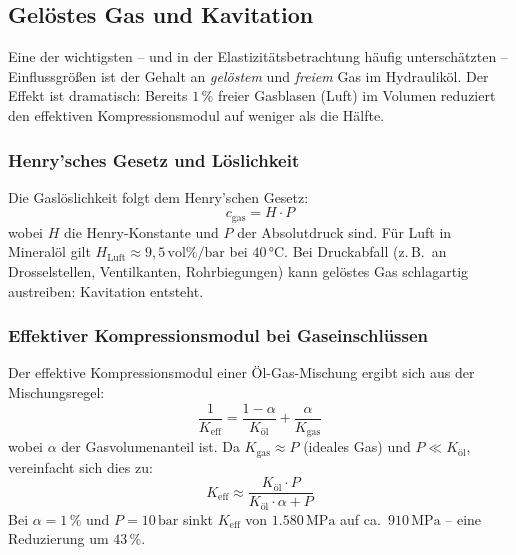 ﻿\documentclass[a4paper,12pt]{scrreprt}
\theoremstyle{definition}
\begin{document}
\subsection{Gelöstes Gas und Kavitation}

Eine der wichtigsten -- und in der Elastizitätsbetrachtung häufig
unterschätzten -- Einflussgrößen ist der Gehalt an \emph{gelöstem} und
\emph{freiem} Gas im Hydrauliköl. Der Effekt ist dramatisch: Bereits
$1\,\%$ freier Gasblasen (Luft) im Volumen reduziert den effektiven
Kompressionsmodul auf weniger als die Hälfte.

\subsubsection{Henry'sches Gesetz und Löslichkeit}

Die Gaslöslichkeit folgt dem Henry'schen Gesetz:
\begin{equation}
  c_{\mathrm{gas}} = H \cdot P
  \label{eq:henry}
\end{equation}
wobei $H$ die Henry-Konstante und $P$ der Absolutdruck sind. Für Luft in
Mineralöl gilt $H_{\mathrm{Luft}} \approx 9{,}5\,\mathrm{vol\%/bar}$ bei
$40\, °\mathrm{C}$. Bei Druckabfall (z.\,B.\ an Drosselstellen, Ventilkanten,
Rohrbiegungen) kann gelöstes Gas schlagartig austreiben: Kavitation entsteht.

\subsubsection{Effektiver Kompressionsmodul bei Gaseinschlüssen}

Der effektive Kompressionsmodul einer Öl-Gas-Mischung ergibt sich aus der
Mischungsregel:
\begin{equation}
  \frac{1}{K_{\mathrm{eff}}} = \frac{1 - \alpha}{K_{\mathrm{öl}}}
    + \frac{\alpha}{K_{\mathrm{gas}}}
  \label{eq:k_effektiv}
\end{equation}
wobei $\alpha$ der Gasvolumenanteil ist. Da $K_{\mathrm{gas}} \approx P$
(ideales Gas) und $P \ll K_{\mathrm{öl}}$, vereinfacht sich dies zu:
\begin{equation}
  K_{\mathrm{eff}} \approx \frac{K_{\mathrm{öl}} \cdot P}{K_{\mathrm{öl}} \cdot \alpha + P}
  \label{eq:k_eff_approx}
\end{equation}
Bei $\alpha = 1\,\%$ und $P = 10\,\mathrm{bar}$ sinkt $K_{\mathrm{eff}}$
von $1.580\,\mathrm{MPa}$ auf ca.\ $910\,\mathrm{MPa}$ -- eine Reduzierung
um $43\,\%$.
\end{document}
